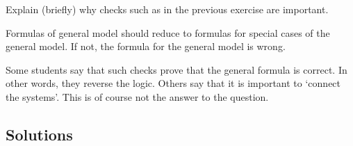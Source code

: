 \begin{exercise}[201904]
 Explain (briefly) why checks such as in the previous exercise are important.
\begin{solution}
 Formulas of general model should reduce to formulas for special cases of the general model. If not, the formula for the general model is wrong.

 Some students say that such checks prove that the general formula is correct.
 In other words, they reverse the logic.
 Others say that it is important to `connect the systems'.
 This is of course not the answer to the question.
\end{solution}
\end{exercise}




\subsection*{Solutions}




